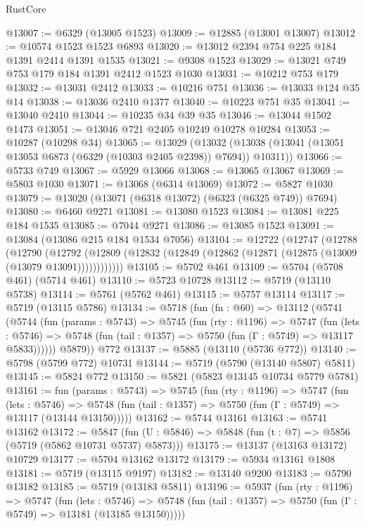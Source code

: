 \begin{lexlean}{RustCore}
\begin{coremodule}
@13007 := @6329 (@13005 @1523)
@13009 := @12885 (@13001 @13007)
@13012 := @10574 @1523 @1523 @6893
@13020 := @13012 @2394 @754 @225 @184 @1391 @2414 @1391 @1535
@13021 := @9308 @1523
@13029 := @13021 @749 @753 @179 @184 @1391 @2412 @1523 @1030
@13031 := @10212 @753 @179
@13032 := @13031 @2412
@13033 := @10216 @751
@13036 := @13033 @124 @35 @14
@13038 := @13036 @2410 @1377
@13040 := @10223 @751 @35
@13041 := @13040 @2410
@13044 := @10235 @34 @39 @35
@13046 := @13044 @1502 @1473
@13051 := @13046 @721 @2405 @10249 @10278 @10284
@13053 := @10287 (@10298 @34)
@13065 := @13029
    (@13032 (@13038 (@13041 (@13051 @13053 @6873 (@6329 (@10303 @2405 @2398)) @7694)) @10311))
@13066 := @5733 @749
@13067 := @5929 @13066
@13068 := @13065 @13067
@13069 := @5803 @1030
@13071 := @13068 (@6314 @13069)
@13072 := @5827 @1030
@13079 := @13020 (@13071 (@6318 @13072) (@6323 (@6325 @749)) @7694)
@13080 := @6460 @9271
@13081 := @13080 @1523
@13084 := @13081 @225 @184 @1535
@13085 := @7044 @9271
@13086 := @13085 @1523
@13091 := @13084 (@13086 @215 @184 @1534 @7056)
@13104 := @12722
    (@12747
      (@12788
        (@12790
          (@12792 (@12809 (@12832 (@12849 (@12862 (@12871 (@12875 (@13009 (@13079 @13091))))))))))))
@13105 := @5702 @461
@13109 := @5704 (@5708 @461) (@5714 @461)
@13110 := @5723 @10728
@13112 := @5719 (@13110 @5738)
@13114 := @5761 (@5762 @461)
@13115 := @5757 @13114
@13117 := @5719 (@13115 @5786)
@13134 := @5718
    (fun (fn : @60) =>
    @13112
      (@5741
        (@5744
          (fun (params : @5743) =>
          @5745
            (fun (rty : @1196) =>
            @5747
              (fun (lets : @5746) =>
              @5748 (fun (tail : @1357) => @5750 (fun (Γ : @5749) => @13117 @5833))))))
        @5879))
    @772
@13137 := @5885 (@13110 (@5736 @772))
@13140 := @5798 (@5799 @772) @10731
@13144 := @5719 (@5790 (@13140 @5807) @5811)
@13145 := @5824 @772
@13150 := @5821 (@5823 @13145 @10734 @5779 @5781)
@13161 := fun (params : @5743) =>
  @5745
    (fun (rty : @1196) =>
    @5747
      (fun (lets : @5746) =>
      @5748 (fun (tail : @1357) => @5750 (fun (Γ : @5749) => @13117 (@13144 @13150)))))
@13162 := @5744 @13161
@13163 := @5741 @13162
@13172 := @5847
    (fun (U : @5846) => @5848 (fun (t : @7) => @5856 (@5719 (@5862 @10731 @5737) @5873)))
@13175 := @13137 (@13163 @13172) @10729
@13177 := @5704 @13162 @13172
@13179 := @5934 @13161 @1808
@13181 := @5719 (@13115 @9197)
@13182 := @13140 @9200
@13183 := @5790 @13182
@13185 := @5719 (@13183 @5811)
@13196 := @5937
    (fun (rty : @1196) =>
    @5747
      (fun (lets : @5746) =>
      @5748 (fun (tail : @1357) => @5750 (fun (Γ : @5749) => @13181 (@13185 @13150)))))

\end{coremodule}
\end{lexlean}
